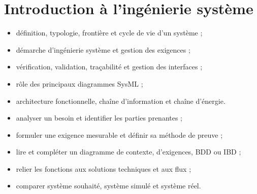 \documentclass[10pt,a4paper,openany]{book}
\begin{document}
\tableofcontents
\clearpage
\chapter{Introduction à l'ingénierie système}

\begin{savoirs}
\begin{itemize}
  \item définition, typologie, frontière et cycle de vie d'un système ;
  \item démarche d'ingénierie système et gestion des exigences ;
  \item vérification, validation, traçabilité et gestion des interfaces ;
  \item rôle des principaux diagrammes SysML ;
  \item architecture fonctionnelle, chaîne d'information et chaîne d'énergie.
\end{itemize}
\end{savoirs}

\begin{savoirfaire}
\begin{itemize}
  \item analyser un besoin et identifier les parties prenantes ;
  \item formuler une exigence mesurable et définir sa méthode de preuve ;
  \item lire et compléter un diagramme de contexte, d'exigences, BDD ou IBD ;
  \item relier les fonctions aux solutions techniques et aux flux ;
  \item comparer système souhaité, système simulé et système réel.
\end{itemize}
\end{savoirfaire}





\end{document}
